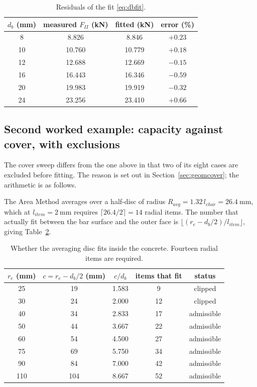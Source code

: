 \begin{table}[H]
\centering
\caption{Residuals of the fit \eqref{eq:dbfit}.}
\label{tab:lsqresid}
\small
\begin{tabular*}{\linewidth}{@{\extracolsep{\fill}}cccc@{}}
\hline
$d_b$ (mm) & measured $F_{II}$ (kN) & fitted (kN) & error (\%) \\
\hline
8  & 8.826  & 8.846  & $+0.23$ \\
10 & 10.760 & 10.779 & $+0.18$ \\
12 & 12.688 & 12.669 & $-0.15$ \\
16 & 16.443 & 16.346 & $-0.59$ \\
20 & 19.983 & 19.919 & $-0.32$ \\
24 & 23.256 & 23.410 & $+0.66$ \\
\hline
\end{tabular*}
\end{table}

\subsection*{Second worked example: capacity against cover, with exclusions}

The cover sweep differs from the one above in that two of its eight cases
are excluded before fitting. The reason is set out in
Section~\ref{sec:geomcover}; the arithmetic is as follows.

The Area Method averages over a half-disc of radius
$R_{avg} = 1.32\,l_{char} = \SI{26.4}{\milli\metre}$, which at
$l_{item} = \SI{2}{\milli\metre}$ requires
$\lceil 26.4/2 \rceil = 14$ radial items. The number that actually fit
between the bar surface and the outer face is
$\lfloor (r_e - d_b/2)/l_{item} \rfloor$, giving
Table~\ref{tab:clipcheck}.

\begin{table}[H]
\centering
\caption{Whether the averaging disc fits inside the concrete. Fourteen
         radial items are required.}
\label{tab:clipcheck}
\small
\begin{tabular*}{\linewidth}{@{\extracolsep{\fill}}ccccc@{}}
\hline
$r_e$ (mm) & $c = r_e - d_b/2$ (mm) & $c/d_b$ & items that fit & status \\
\hline
25  & 19  & 1.583 & 9  & clipped \\
30  & 24  & 2.000 & 12 & clipped \\
40  & 34  & 2.833 & 17 & admissible \\
50  & 44  & 3.667 & 22 & admissible \\
60  & 54  & 4.500 & 27 & admissible \\
75  & 69  & 5.750 & 34 & admissible \\
90  & 84  & 7.000 & 42 & admissible \\
110 & 104 & 8.667 & 52 & admissible \\
\hline
\end{tabular*}
\end{table}

